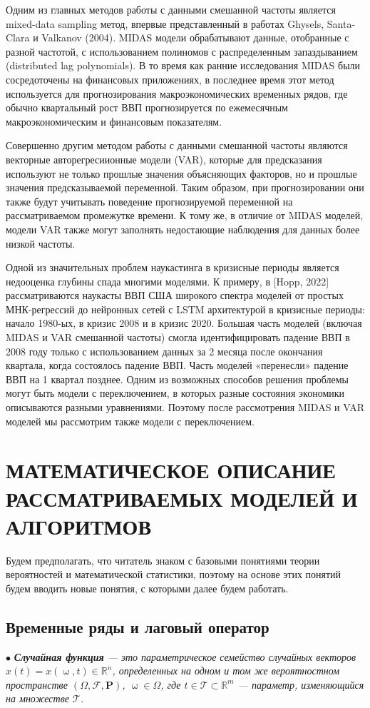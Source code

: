 \documentclass[a4paper, 12pt]{extarticle}
\newcommand{\Rm}{\mathbb{R}}
\renewcommand{\omega}{\upomega}
\begin{document}
	Одним из главных методов работы с данными смешанной частоты является mixed-data sampling метод, впервые представленный в работах Ghysels, Santa-Clara и Valkanov (2004). MIDAS модели
	обрабатывают данные, отобранные с разной частотой, с
	использованием полиномов с распределенным запаздыванием (distributed lag polynomials). В то время как ранние исследования MIDAS были сосредоточены на финансовых
	приложениях, в последнее время этот метод
	используется для прогнозирования макроэкономических временных рядов, где обычно квартальный
	рост ВВП прогнозируется по ежемесячным макроэкономическим и финансовым показателям.
	
	Совершенно другим методом работы с данными смешанной частоты являются векторные авторегресиионные модели (VAR), которые для предсказания используют не только прошлые значения объясняющих факторов, но и прошлые значения предсказываемой переменной. Таким образом, при прогнозировании они также будут учитывать поведение прогнозируемой переменной на рассматриваемом промежутке времени. К тому же, в отличие от MIDAS моделей, модели VAR также могут заполнять недостающие наблюдения для данных более низкой частоты.
	
	Одной из значительных проблем наукастинга в кризисные периоды является недооценка глубины спада многими моделями. К примеру, в [Hopp, 2022] рассматриваются наукасты ВВП США широкого спектра моделей от простых МНК-регрессий до нейронных сетей с LSTM архитектурой в кризисные периоды: начало 1980-ых, в кризис 2008 и в кризис 2020. Большая часть моделей (включая MIDAS и VAR смешанной частоты) смогла идентифицировать падение ВВП в 2008 году только с использованием данных за 2 месяца после окончания квартала, когда состоялось падение ВВП. Часть моделей «перенесли» падение ВВП на 1 квартал позднее. Одним из возможных способов решения проблемы могут быть модели с переключением, в которых разные состояния экономики описываются разными уравнениями. Поэтому после рассмотрения MIDAS и VAR моделей мы рассмотрим также модели с переключением. 
	\newpage
	\section{МАТЕМАТИЧЕСКОЕ ОПИСАНИЕ РАССМАТРИВАЕМЫХ МОДЕЛЕЙ И АЛГОРИТМОВ}
	Будем предполагать, что читатель знаком с базовыми понятиями теории вероятностей и математической статистики, поэтому на основе этих понятий будем вводить новые понятия, с которыми далее будем работать.
	\subsection{Временные ряды и лаговый оператор}
	$\bullet$ \textit{\textbf{Случайная функция} --- это параметрическое семейство случайных векторов $x(t) = x(\omega, t)\in \Rm^n$, определенных на одном и том же вероятностном пространстве $(\Omega, \mathcal{F}, \mathbf{P})$, $\omega \in \Omega$, где $t \in \mathcal{T} \subset \Rm^m$ --- параметр, изменяющийся на множестве $\mathcal{T}$.}
	
\end{document}
